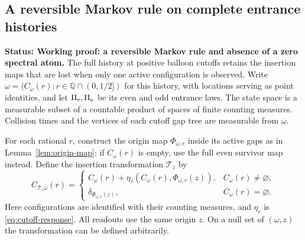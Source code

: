 \documentclass[11pt,letterpaper]{article}
\newcommand{\status}[1]{\textbf{Status: #1.}}
\begin{document}
\subsection{A reversible Markov rule on complete entrance histories}
\label{sec:history-markov}

\status{Working proof: a reversible Markov rule and absence of a zero spectral atom}
The full history at positive balloon cutoffs retains the insertion maps
that are lost when only one active configuration is observed.
Write $\omega=(C_\omega(r):r\in\mathbb Q\cap(0,1/2])$ for this
history, with locations serving as point identities, and let
$\Pi_{\rm e},\Pi_{\rm o}$ be its even and odd entrance laws.
The state space is a measurable subset of a countable product of
spaces of finite counting measures. Collision times and the vertices
of each cutoff gap tree are measurable from $\omega$.

For each rational $r$, construct the origin map
$\Phi_{\omega,r}$ inside its active gaps as in
Lemma~\ref{lem:origin-map}; if $C_\omega(r)$ is empty, use the full
even survivor map instead. Define the insertion transformation
$\mathcal T_z$ by
\begin{equation}\label{eq:history-insertion-rule}
 C_{\mathcal T_z\omega}(r)=
 \begin{cases}
 C_\omega(r)+\eta_r(C_\omega(r),\Phi_{\omega,r}(z)),
      &C_\omega(r)\ne\varnothing,\\
 \delta_{\Phi_{\omega,r}(z)},&C_\omega(r)=\varnothing.
 \end{cases}
\end{equation}
Here configurations are identified with their counting measures,
and $\eta_r$ is \eqref{eq:cutoff-response}.
All readouts use the same origin $z$. On a null set of
$(\omega,z)$ the transformation can be defined arbitrarily.
\end{document}
